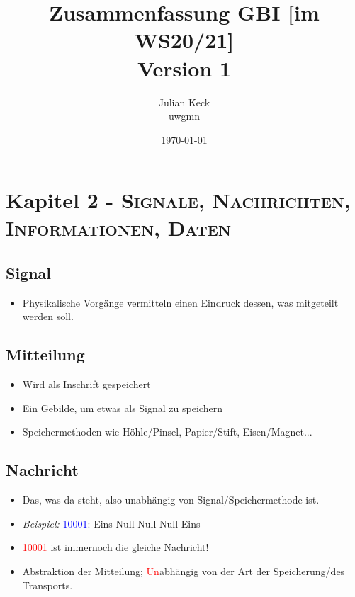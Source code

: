 \documentclass{article}
\newcommand{\subtitlerelsize}{1} %
\newcommand{\subtitlelinesep}{0.1em} %
\newcommand{\kapitel}[2]{Kapitel #1 - \textsc{#2}}
\newcommand{\blue}[1]{\textcolor{blue}{#1}}
\newcommand{\red}[1]{\textcolor{red}{#1}}
\newcommand{\example}[1]{\textit{Beispiel: }#1}
\begin{document}
\title{Zusammenfassung GBI [im WS20/21]\\[\subtitlelinesep]%
    \smaller[\subtitlerelsize]{}Version 1}
\author{Julian Keck\\uwgmn}
\date{\today}
\maketitle

\tableofcontents

\newpage

\section{\kapitel{2}{Signale, Nachrichten, Informationen, Daten}}
\subsection{Signal}
\begin{itemize}
    \item Physikalische Vorgänge vermitteln einen \dq Eindruck\dq{} dessen, was mitgeteilt werden soll.
\end{itemize}

\subsection{Mitteilung}
\begin{itemize}
    \item Wird als Inschrift gespeichert
    \item Ein Gebilde, um etwas als Signal zu speichern
    \item Speichermethoden wie Höhle/Pinsel, Papier/Stift, Eisen/Magnet...
\end{itemize}

\subsection{Nachricht}
\begin{itemize}
    \item Das, was da steht, also unabhängig von Signal/Speichermethode ist.
    \item \example{\blue{10001}: Eins Null Null Null Eins}
    \item \red{10001} ist immernoch die gleiche Nachricht!
    \item Abstraktion der Mitteilung; \red{Un}abhängig von der Art der Speicherung/des Transports.
\end{itemize}
\end{document}
